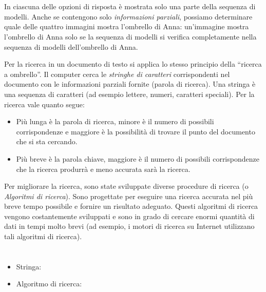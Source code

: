 {{%
\section*{\BrochureItsInformatics}
In ciascuna delle opzioni di risposta è mostrata solo una parte della sequenza di modelli. Anche se contengono solo \emph{informazioni parziali}, possiamo determinare quale delle quattro immagini mostra l’ombrello di Anna: un’immagine mostra l’ombrello di Anna solo se la sequenza di modelli si verifica completamente nella sequenza di modelli dell’ombrello di Anna.

Per la ricerca in un documento di testo si applica lo stesso principio della \enquote{ricerca a ombrello}. Il computer cerca le \emph{stringhe di caratteri} corrispondenti nel documento con le informazioni parziali fornite (parola di ricerca). Una stringa è una sequenza di caratteri (ad esempio lettere, numeri, caratteri speciali).
Per la ricerca vale quanto segue:

\begin{itemize}
  \item Più lunga è la parola di ricerca, minore è il numero di possibili corrispondenze e maggiore è la possibilità di trovare il punto del documento che si sta cercando.
  \item Più breve è la parola chiave, maggiore è il numero di possibili corrispondenze che la ricerca produrrà e meno accurata sarà la ricerca.
\end{itemize}

Per migliorare la ricerca, sono state sviluppate diverse procedure di ricerca (o \emph{Algoritmi di ricerca}). Sono progettate per eseguire una ricerca accurata nel più breve tempo possibile e fornire un risultato adeguato. Questi algoritmi di ricerca vengono costantemente sviluppati e sono in grado di cercare enormi quantità di dati in tempi molto brevi (ad esempio, i motori di ricerca su Internet utilizzano tali algoritmi di ricerca).



\section*{\BrochureWebsitesAndKeywords}
{\raggedright
\begin{itemize}
  \item Stringa: \href{https://it.wikipedia.org/wiki/Stringa_(informatica)}{}
  \item Algoritmo di ricerca: \href{https://it.wikipedia.org/wiki/Algoritmo_di_ricerca}{}
\end{itemize}


}}}
